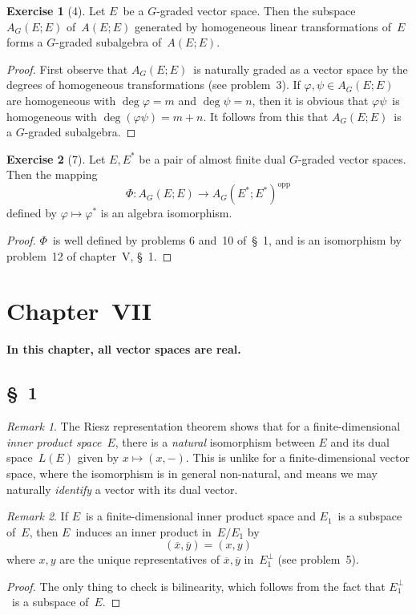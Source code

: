 \documentclass[letterpaper,12pt]{article}
\newcommand{\oc}[1]{#1^{\perp}}
\newcommand{\opp}[1]{#1^{\mathrm{opp}}}
\newcommand{\iprod}[2]{(#1,#2)}
\newcommand{\proj}[1]{\overline{#1}}
\theoremstyle{definition}
\newtheorem*{exer}{Exercise}
\theoremstyle{remark}
\newtheorem*{rmk}{Remark}
\begin{document}
\begin{exer}[4]
Let \(E\)~be a \(G\)-graded vector space. Then the subspace \(A_G(E;E)\) of~\(A(E;E)\) generated by homogeneous linear transformations of~\(E\) forms a \(G\)-graded subalgebra of~\(A(E;E)\).
\end{exer}
\begin{proof}
First observe that \(A_G(E;E)\)~is naturally graded as a vector space by the degrees of homogeneous transformations (see problem~3). If \(\varphi,\psi\in A_G(E;E)\) are homogeneous with \(\deg\varphi=m\) and \(\deg\psi=n\), then it is obvious that \(\varphi\psi\)~is homogeneous with \(\deg(\varphi\psi)=m+n\). It follows from this that \(A_G(E;E)\)~is a \(G\)-graded subalgebra.
\end{proof}

\begin{exer}[7]
Let \(E,E^*\) be a pair of almost finite dual \(G\)-graded vector spaces. Then the mapping
\[\Phi:A_G(E;E)\to\opp{A_G(E^*;E^*)}\]
defined by \(\varphi\mapsto\varphi^*\) is an algebra isomorphism.
\end{exer}
\begin{proof}
\(\Phi\)~is well defined by problems 6 and~10 of~\S~1, and is an isomorphism by problem~12 of chapter~V, \S~1.
\end{proof}

\section*{Chapter~VII}
\textbf{In this chapter, all vector spaces are real.}

\subsection*{\S~1}
\begin{rmk}
The Riesz representation theorem shows that for a finite-dimensional \emph{inner product space}~\(E\), there is a \emph{natural} isomorphism between \(E\) and its dual space~\(L(E)\) given by \(x\mapsto\iprod{x}{-}\). This is unlike for a finite-dimensional vector space, where the isomorphism is in general non-natural, and means we may naturally \emph{identify} a vector with its dual vector.
\end{rmk}

\begin{rmk}
If \(E\)~is a finite-dimensional inner product space and \(E_1\)~is a subspace of~\(E\), then \(E\)~induces an inner product in~\(E/E_1\) by
\[\iprod{\proj{x}}{\proj{y}}=\iprod{x}{y}\]
where \(x,y\) are the unique representatives of \(\proj{x},\proj{y}\) in~\(\oc{E_1}\) (see problem~5).
\end{rmk}
\begin{proof}
The only thing to check is bilinearity, which follows from the fact that \(\oc{E_1}\)~is a subspace of~\(E\).
\end{proof}
\end{document}
